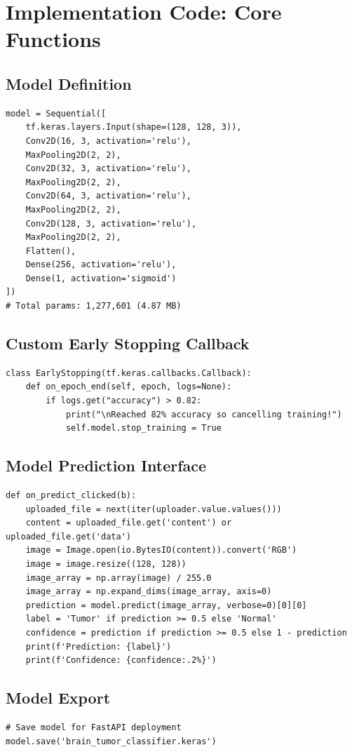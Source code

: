 \documentclass[12pt,a4paper]{article}
\begin{document}
\newpage

\appendix
\section{Implementation Code: Core Functions}

\subsection{Model Definition}

\begin{lstlisting}
model = Sequential([
    tf.keras.layers.Input(shape=(128, 128, 3)),
    Conv2D(16, 3, activation='relu'),
    MaxPooling2D(2, 2),
    Conv2D(32, 3, activation='relu'),
    MaxPooling2D(2, 2),
    Conv2D(64, 3, activation='relu'),
    MaxPooling2D(2, 2),
    Conv2D(128, 3, activation='relu'),
    MaxPooling2D(2, 2),
    Flatten(),
    Dense(256, activation='relu'),
    Dense(1, activation='sigmoid')
])
# Total params: 1,277,601 (4.87 MB)
\end{lstlisting}

\subsection{Custom Early Stopping Callback}

\begin{lstlisting}
class EarlyStopping(tf.keras.callbacks.Callback):
    def on_epoch_end(self, epoch, logs=None):
        if logs.get("accuracy") > 0.82:
            print("\nReached 82% accuracy so cancelling training!")
            self.model.stop_training = True
\end{lstlisting}

\subsection{Model Prediction Interface}

\begin{lstlisting}
def on_predict_clicked(b):
    uploaded_file = next(iter(uploader.value.values()))
    content = uploaded_file.get('content') or uploaded_file.get('data')
    image = Image.open(io.BytesIO(content)).convert('RGB')
    image = image.resize((128, 128))
    image_array = np.array(image) / 255.0
    image_array = np.expand_dims(image_array, axis=0)
    prediction = model.predict(image_array, verbose=0)[0][0]
    label = 'Tumor' if prediction >= 0.5 else 'Normal'
    confidence = prediction if prediction >= 0.5 else 1 - prediction
    print(f'Prediction: {label}')
    print(f'Confidence: {confidence:.2%}')
\end{lstlisting}

\subsection{Model Export}

\begin{lstlisting}
# Save model for FastAPI deployment
model.save('brain_tumor_classifier.keras')
\end{lstlisting}
\end{document}

